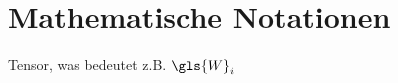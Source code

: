 \section{Mathematische Notationen}
\label{mathematische_notationen}

Tensor, was bedeutet z.B. $\gls{W}_i$
